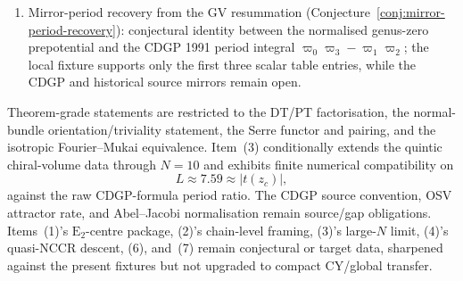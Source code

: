 \documentclass[12pt]{amsart}
\theoremstyle{remark}
\providecommand{\E}{\mathrm{E}}
\begin{document}
\begin{enumerate}
    vocabulary only; HKQ, GV, CDGP, and conifold-resurgence rows remain
    open. Residual obstruction: convergence of the GV/BPS series and the
    global resurgent sheaf across all Stokes walls simultaneously
    (Conjecture~\ref{conj:bcov-np-quintic} and the following remark).
  \item Mirror-period recovery from the GV resummation
    (Conjecture~\ref{conj:mirror-period-recovery}): conjectural identity
    between the normalised genus-zero prepotential and the CDGP 1991
    period integral $\varpi_0 \varpi_3 - \varpi_1 \varpi_2$; the local
    fixture supports only the first three scalar table entries, while the
    CDGP and historical source mirrors remain open.
\end{enumerate}

Theorem-grade statements are restricted to the DT/PT
factorisation, the normal-bundle orientation/triviality statement, the
Serre functor and pairing, and the isotropic Fourier--Mukai equivalence.
Item~(3) conditionally extends the quintic chiral-volume data through
$N = 10$ and exhibits finite numerical compatibility on
\[
  L \approx 7.59 \approx |t(z_c)|,
\]
against the raw CDGP-formula period ratio. The CDGP source convention,
OSV attractor rate, and Abel--Jacobi normalisation remain source/gap
obligations.
Items~(1)'s \(\E_2\)-centre package, (2)'s chain-level framing, (3)'s
large-\(N\) limit, (4)'s quasi-NCCR descent, (6), and~(7) remain
conjectural or target data, sharpened against the present fixtures but
not upgraded to compact CY/global transfer.
\end{document}
